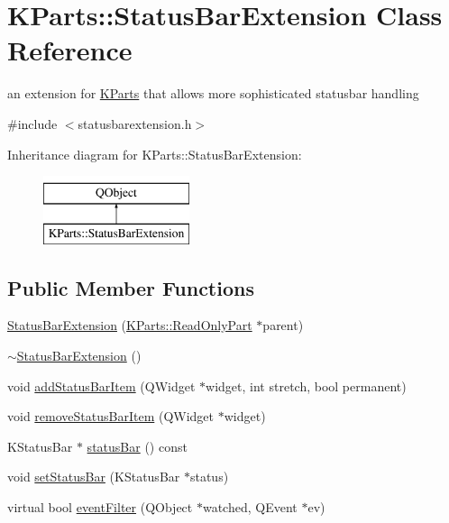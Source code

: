 \hypertarget{classKParts_1_1StatusBarExtension}{\section{K\+Parts\+:\+:Status\+Bar\+Extension Class Reference}
\label{classKParts_1_1StatusBarExtension}
}


an extension for \hyperlink{namespaceKParts}{K\+Parts} that allows more sophisticated statusbar handling  




{\ttfamily \#include $<$statusbarextension.\+h$>$}

Inheritance diagram for K\+Parts\+:\+:Status\+Bar\+Extension\+:\begin{figure}[H]
\begin{center}
\leavevmode
\includegraphics[height=2.000000cm]{classKParts_1_1StatusBarExtension}
\end{center}
\end{figure}
\subsection*{Public Member Functions}
\begin{DoxyCompactItemize}
\item 
\hyperlink{classKParts_1_1StatusBarExtension_a0130c3d5e970d44be6e1543cd5ae7324}{Status\+Bar\+Extension} (\hyperlink{classKParts_1_1ReadOnlyPart}{K\+Parts\+::\+Read\+Only\+Part} $\ast$parent)
\item 
\hyperlink{classKParts_1_1StatusBarExtension_a47bc9c8acae9b46bfa04ea0297e80bd8}{$\sim$\+Status\+Bar\+Extension} ()
\item 
void \hyperlink{classKParts_1_1StatusBarExtension_aaa7efe1d1a03b9d613c5bb8cbb6691d4}{add\+Status\+Bar\+Item} (Q\+Widget $\ast$widget, int stretch, bool permanent)
\item 
void \hyperlink{classKParts_1_1StatusBarExtension_adaef7e1acbb9373168ae531e0792ab6e}{remove\+Status\+Bar\+Item} (Q\+Widget $\ast$widget)
\item 
K\+Status\+Bar $\ast$ \hyperlink{classKParts_1_1StatusBarExtension_a561eaf86df9e40f4217d0cfed58d92bb}{status\+Bar} () const 
\item 
void \hyperlink{classKParts_1_1StatusBarExtension_a6e3e3e8969ec67285ef7749f6c9caa85}{set\+Status\+Bar} (K\+Status\+Bar $\ast$status)
\item 
virtual bool \hyperlink{classKParts_1_1StatusBarExtension_a05a310b221e20aa0ba60156be82a37ef}{event\+Filter} (Q\+Object $\ast$watched, Q\+Event $\ast$ev)
\end{DoxyCompactItemize}
